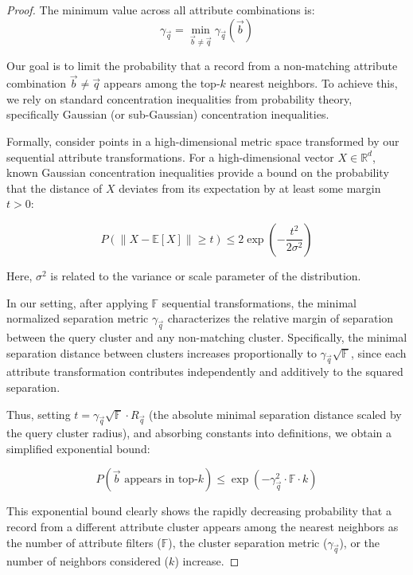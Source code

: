 \documentclass[numbers,sort]{article}
\begin{document}
\begin{proof}
The minimum value across all attribute combinations is:
\begin{equation}
\gamma_{\vec{q}} = \min_{\vec{b} \neq \vec{q}} \gamma_{\vec{q}}(\vec{b})
\end{equation}

Our goal is to limit the probability that a record from a non-matching attribute combination $\vec{b}\neq\vec{q}$ appears among the top-$k$ nearest neighbors. To achieve this, we rely on standard concentration inequalities from probability theory, specifically Gaussian (or sub-Gaussian) concentration inequalities.

Formally, consider points in a high-dimensional metric space transformed by our sequential attribute transformations. For a high-dimensional vector $X \in \mathbb{R}^d$, known Gaussian concentration inequalities provide a bound on the probability that the distance of $X$ deviates from its expectation by at least some margin $t > 0$:

\begin{equation}
P\left(\|X - \mathbb{E}[X]\| \geq t\right) \leq 2\exp\left(-\frac{t^2}{2\sigma^2}\right)
\end{equation}

Here, $\sigma^2$ is related to the variance or scale parameter of the distribution.

In our setting, after applying $\mathbb{F}$ sequential transformations, the minimal normalized separation metric $\gamma_{\vec{q}}$ characterizes the relative margin of separation between the query cluster and any non-matching cluster. Specifically, the minimal separation distance between clusters increases proportionally to $\gamma_{\vec{q}} \sqrt{\mathbb{F}}$, since each attribute transformation contributes independently and additively to the squared separation.

Thus, setting $t = \gamma_{\vec{q}}\sqrt{\mathbb{F}}\cdot R_{\vec{q}}$ (the absolute minimal separation distance scaled by the query cluster radius), and absorbing constants into definitions, we obtain a simplified exponential bound:

\begin{equation}
P(\vec{b}\text{ appears in top-}k)\leq\exp(-\gamma_{\vec{q}}^2\cdot\mathbb{F}\cdot k)
\end{equation}

This exponential bound clearly shows the rapidly decreasing probability that a record from a different attribute cluster appears among the nearest neighbors as the number of attribute filters ($\mathbb{F}$), the cluster separation metric ($\gamma_{\vec{q}}$), or the number of neighbors considered ($k$) increase.


\end{proof}
\end{document}
